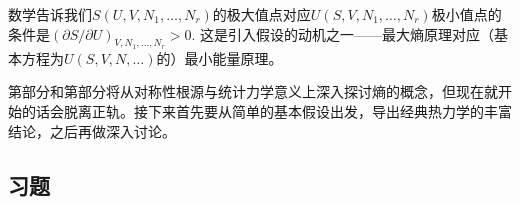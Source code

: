 数学告诉我们$S(U, V, N_1, \dots, N_r)$的极大值点对应$U(S, V, N_1, \dots, N_r)$极小值点的条件是$(\partial S/\partial U)_{V, N_1, \dots, N_r} > 0$. 这是引入假设\uppercase\expandafter{}的动机之一——最大熵原理对应（基本方程为$U(S, V, N, \dots)$的）最小能量原理。

第\uppercase\expandafter{}部分和第\uppercase\expandafter{}部分将从对称性根源与统计力学意义上深入探讨熵的概念，但现在就开始的话会脱离正轨。接下来首先要从简单的基本假设出发，导出经典热力学的丰富结论，之后再做深入讨论。

\subsection*{习题}
